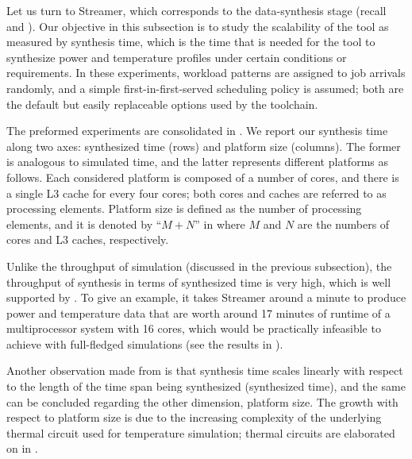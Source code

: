 
Let us turn to Streamer, which corresponds to the data-synthesis stage (recall
 and ). Our objective in this subsection is to
study the scalability of the tool as measured by synthesis time, which is the
time that is needed for the tool to synthesize power and temperature profiles
under certain conditions or requirements. In these experiments, workload
patterns are assigned to job arrivals randomly, and a simple
first-in-first-served scheduling policy is assumed; both are the default but
easily replaceable options used by the toolchain.

The preformed experiments are consolidated in . We report our
synthesis time along two axes: synthesized time (rows) and platform size
(columns). The former is analogous to simulated time, and the latter represents
different platforms as follows. Each considered platform is composed of a number
of cores, and there is a single L3 cache for every four cores; both cores and
caches are referred to as processing elements. Platform size is defined as the
number of processing elements, and it is denoted by ``$M + N$'' in
 where $M$ and $N$ are the numbers of cores and L3 caches,
respectively.

Unlike the throughput of simulation (discussed in the previous subsection), the
throughput of synthesis in terms of synthesized time is very high, which is well
supported by . To give an example, it takes Streamer around a
minute to produce power and temperature data that are worth around 17 minutes of
runtime of a multiprocessor system with 16 cores, which would be practically
infeasible to achieve with full-fledged simulations (see the results in
).

Another observation made from  is that synthesis time scales
linearly with respect to the length of the time span being synthesized
(synthesized time), and the same can be concluded regarding the other dimension,
platform size. The growth with respect to platform size is due to the increasing
complexity of the underlying thermal  circuit used for temperature
simulation; thermal circuits are elaborated on in .

